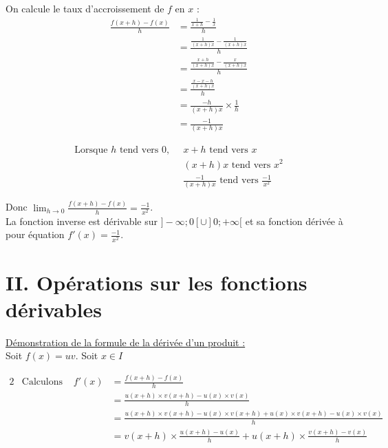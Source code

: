 \documentclass[11pt,a4paper]{article}
\begin{document}
            On calcule le taux d'accroissement de $f$ en $x$ :
            \begin{equation*}
                \begin{split}
                    \frac{f(x+h)-f(x)}{h}&=\frac{\frac{1}{x+h}-\frac{1}{x}}{h}\\
                    &=\frac{\frac{1}{(x+h)x}-\frac{1}{(x+h)x}}{h} \\
                    &=\frac{\frac{x+h}{(x+h)x}-\frac{x}{(x+h)x}}{h}\\
                    &=\frac{\frac{x-x-h}{(x+h)x}}{h}\\
                    &=\frac{-h}{(x+h)x}\times\frac{1}{h}\\
                    &=\frac{-1}{(x+h)x}
                \end{split}
            \end{equation*}

            \begin{equation*}
                \begin{split}
                    \text{Lorsque $h$ tend vers $0$,}&\text{ $x+h$ tend vers $x$}\\
                    &\text{ $(x+h)x$ tend vers $x^2$}\\
                    &\text{ $\frac{-1}{(x+h)x}$ tend vers $\frac{-1}{x^2}$}
                \end{split}
            \end{equation*}

            Donc $\displaystyle{\lim_{h\to0}\frac{f(x+h)-f(x)}{h}}=\frac{-1}{x^2}$. ~\\

            La fonction inverse est dérivable sur $]-\infty;0[\cup]0;+\infty[$ et sa fonction dérivée à pour équation $f'(x)=\frac{-1}{x^2}$.

\section*{II. Opérations sur les fonctions dérivables}

\underline{Démonstration de la formule de la dérivée d'un produit :} ~\\

Soit $f(x)=uv$. Soit $x\in I$

\begin{alignat*}{2}
     & \text{Calculons } & f'(x) & = \frac{f(x+h)-f(x)}{h}                                                                     \\
     &                   &       & = \frac{u(x+h)\times v(x+h) - u(x) \times v(x)}{h}                                          \\
     &                   &       & = \frac{u(x+h)\times v(x+h)  -u(x)\times v(x+h) +u(x)\times v(x+h)   - u(x) \times v(x)}{h} \\
     &                   &       & = v(x+h)\times \frac{u(x+h)-u(x)}{h} + u(x+h)\times \frac{v(x+h)-v(x)}{h}
\end{alignat*}
\end{document}
